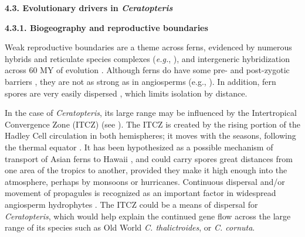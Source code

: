 \documentclass[12pt]{article}
\begin{document}
\begin{flushleft}
{\textbf{4.3. Evolutionary drivers in \textit{Ceratopteris}}}

\textbf{4.3.1. Biogeography and reproductive boundaries}

Weak reproductive boundaries are a theme across ferns, evidenced by numerous hybrids and reticulate species complexes (\emph{e.g.}, \cite{Barrington1989,  Paris1989, Sessa2012a, Sigel2016, Yatabe2009}), and intergeneric hybridization across 60 MY of evolution \autocite{Rothfels2015}. Although ferns do have some pre- and post-zygotic barriers \autocite{Haufler2016}, they are not as strong as in angiosperms (e.g., \cite{De_Nettancourt1997, Lafon-Placette2016}). In addition, fern spores are very easily dispersed \autocite{Tryon1970, Smith1972}, which limits isolation by distance. 

In the case of \textit{Ceratopteris}, its large range may be influenced by the Intertropical Convergence Zone (ITCZ) (see \cite{Dettmann1992, LloydTax1974, Schneider2014}). The ITCZ is created by the rising portion of the Hadley Cell circulation in both hemispheres; it moves with the seasons, following the thermal equator \cite{Schneider2014}. It has been hypothesized as a possible mechanism of transport of Asian ferns to Hawaii \autocite{Geiger2007}, and could carry spores great distances from one area of the tropics to another, provided they make it high enough into the atmosphere, perhaps by monsoons or hurricanes. Continuous dispersal and/or movement of propagules is recognized as an important factor in widespread angiosperm hydrophytes \autocite{Les2003, Spalik2014}. The ITCZ could be a means of dispersal for \textit{Ceratopteris}, which would help explain the continued gene flow across the large range of its species such as Old World \textit{C. thalictroides}, or \textit{C. cornuta}. 


\end{flushleft}
\end{document}
